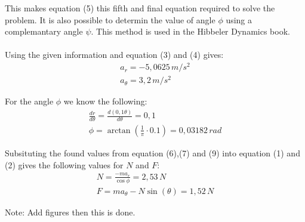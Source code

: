 \documentclass[11pt, a4paper]{article}
\begin{document}
This makes equation (5) this fifth and final equation required to solve the problem. It is also possible to
determin the value of angle $\phi$ using a complemantary angle $\psi$. This method is used in the Hibbeler Dynamics book.\\
\\
Using the given information and equation (3) and (4) gives:
\begin{gather}
    a_r = -5,0625\,m/s^2\\
    a_\theta = 3,2\,m/s^2
\end{gather}

For the angle $\phi$ we know the following:
\begin{gather}
    \frac{dr}{d\theta} = \frac{d(0,1\theta)}{d\theta} = 0,1 \\
    \phi = \arctan \left(\frac{1}{\pi} \cdot 0.1 \right) = 0,03182\,rad
\end{gather}

Subsituting the found values from equation (6),(7) and (9) into equation (1) and (2)
gives the following values for $N$ and $F$:
\begin{gather}
    N = \frac{-ma_r}{\cos{\phi}} = 2,53\,N\\
    F = ma_\theta - N\sin(\theta) = 1,52\,N
\end{gather}

Note: Add figures then this is done.
\end{document}
